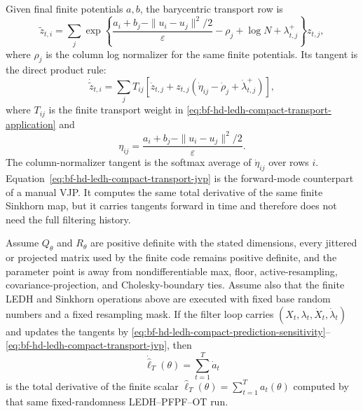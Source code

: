 Given final finite potentials \(a,b\), the barycentric transport row is
\begin{equation}
  \tilde z_{t,i}
  =
  \sum_j
  \exp\left\{
    \frac{a_i+b_j-\|u_i-u_j\|^2/2}{\varepsilon}
    -\rho_j+\log N+\lambda^+_{t,j}
  \right\}z_{t,j},
  \label{eq:bf-hd-ledh-compact-transport-application}
\end{equation}
where \(\rho_j\) is the column log normalizer for the same finite potentials.
Its tangent is the direct product rule:
\begin{equation}
  \dot{\tilde z}_{t,i}
  =
  \sum_j T_{ij}\left[
    \dot z_{t,j}
    + z_{t,j}
      \left(
        \dot\eta_{ij}-\dot\rho_j+\dot\lambda^+_{t,j}
      \right)
  \right],
  \label{eq:bf-hd-ledh-compact-transport-jvp}
\end{equation}
where \(T_{ij}\) is the finite transport weight in
\eqref{eq:bf-hd-ledh-compact-transport-application} and
\[
  \eta_{ij}
  =
  \frac{a_i+b_j-\|u_i-u_j\|^2/2}{\varepsilon}.
\]
The column-normalizer tangent is the softmax average of \(\dot\eta_{ij}\) over
rows \(i\).  Equation~\eqref{eq:bf-hd-ledh-compact-transport-jvp} is the
forward-mode counterpart of a manual VJP.  It computes the same total
derivative of the same finite Sinkhorn map, but it carries tangents forward in
time and therefore does not need the full filtering history.

\begin{proposition}
\label{prop:bf-hd-ledh-compact-sensitivity-score}
Assume \(Q_\theta\) and \(R_\theta\) are positive definite with the stated
dimensions, every jittered or projected matrix used by the finite code remains
positive definite, and the parameter point is away from nondifferentiable max,
floor, active-resampling, covariance-projection, and Cholesky-boundary ties.
Assume also that the finite LEDH and Sinkhorn operations above are executed with
fixed base random numbers and a fixed resampling mask.  If the filter loop carries
\((X_t,\lambda_t,\dot X_t,\dot\lambda_t)\) and updates the tangents by
\eqref{eq:bf-hd-ledh-compact-prediction-sensitivity}--
\eqref{eq:bf-hd-ledh-compact-transport-jvp}, then
\[
  \dot{\widehat\ell}_T(\theta)
  =
  \sum_{t=1}^T \dot a_t
  \label{eq:bf-hd-ledh-compact-score}
\]
is the total derivative of the finite scalar
\(\widehat\ell_T(\theta)=\sum_{t=1}^T a_t(\theta)\) computed by that same
fixed-randomness LEDH--PFPF--OT run.
\end{proposition}

